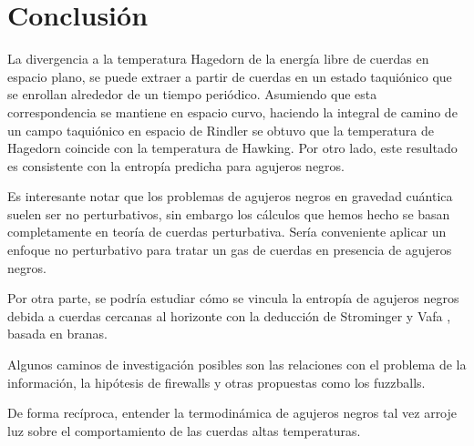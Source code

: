 \chapter{Conclusión}

La divergencia a la temperatura Hagedorn de la energía libre de cuerdas en espacio plano,
se puede extraer a partir de cuerdas en un estado taquiónico que se enrollan alrededor de
un tiempo periódico.
Asumiendo que esta correspondencia se mantiene en espacio curvo, haciendo la integral 
de camino de un campo taquiónico en espacio de Rindler se obtuvo que la temperatura de Hagedorn
coincide con la temperatura de Hawking.
Por otro lado, este resultado es consistente con la entropía predicha para agujeros negros.

Es interesante notar que los problemas de agujeros negros en gravedad cuántica suelen ser
no perturbativos, sin embargo los cálculos que hemos hecho se basan completamente en teoría de 
cuerdas perturbativa.
Sería conveniente aplicar un enfoque no perturbativo para tratar un gas de cuerdas en presencia de agujeros negros.

Por otra parte, se podría estudiar cómo se vincula la entropía de agujeros negros debida a cuerdas cercanas al horizonte con la deducción 
de Strominger y Vafa \cite{Strominger}, basada en branas.

Algunos caminos de investigación posibles son las relaciones con el problema de la información, la hipótesis de firewalls y
otras propuestas como los fuzzballs.

De forma recíproca, entender la termodinámica de agujeros negros tal vez arroje luz sobre el 
comportamiento de las cuerdas altas temperaturas.

